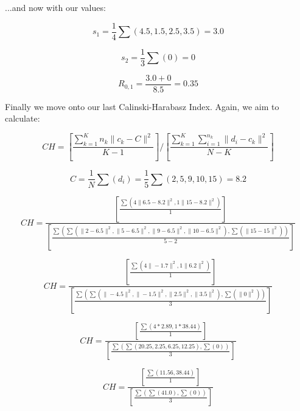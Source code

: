 \documentclass{article}
\begin{document}
\noindent ...and now with our values:

\begin{equation}
    s_1 = \frac{1}{4} \sum (4.5, 1.5, 2.5, 3.5) = 3.0
\end{equation}

\begin{equation}
    s_2 = \frac{1}{3} \sum (0) = 0
\end{equation}

\begin{equation}
    R_{0,1} = \frac{3.0 + 0}{8.5} = 0.35
\end{equation}


Finally we move onto our last Calinski-Harabasz Index. Again, we aim to calculate:

\begin{equation}
    CH = \left\lbrack \frac{\sum^K_{k=1} n_k \|c_k-C\|^2}{K-1} \right\rbrack / \left\lbrack \frac{\sum^K_{k=1} \sum^{n_k}_{i=1} \| d_i - c_k \|^2}{N-K}\right\rbrack
\end{equation}

\begin{equation}
    C = \frac{1}{N} \sum (d_i) = \frac{1}{5} \sum (2,5,9,10,15) = 8.2
\end{equation}

\begin{equation}
    CH = \frac{\left\lbrack \frac{\sum (4\|6.5-8.2\|^2, 1\|15-8.2\|^2)}{1} \right\rbrack} { \left\lbrack \frac{\sum (\sum (\|2-6.5\|^2, \|5-6.5\|^2, \|9-6.5\|^2, \|10-6.5\|^2), \sum(\|15-15\|^2) )}{5-2} \right\rbrack}
\end{equation}

\begin{equation}
    CH = \frac{\left\lbrack \frac{\sum (4\|-1.7\|^2, 1\|6.2\|^2)}{1} \right\rbrack} { \left\lbrack \frac{\sum (\sum (\|-4.5\|^2, \|-1.5\|^2, \|2.5\|^2, \|3.5\|^2), \sum(\|0\|^2) )}{3} \right\rbrack}
\end{equation}

\begin{equation}
    CH = \frac{\left\lbrack \frac{\sum (4*2.89, 1*38.44)}{1} \right\rbrack} { \left\lbrack \frac{\sum (\sum (20.25, 2.25, 6.25, 12.25), \sum(0) )}{3} \right\rbrack}
\end{equation}

\begin{equation}
    CH = \frac{\left\lbrack \frac{\sum (11.56, 38.44)}{1} \right\rbrack} { \left\lbrack \frac{\sum (\sum (41.0), \sum(0) )}{3} \right\rbrack}
\end{equation}
\end{document}
